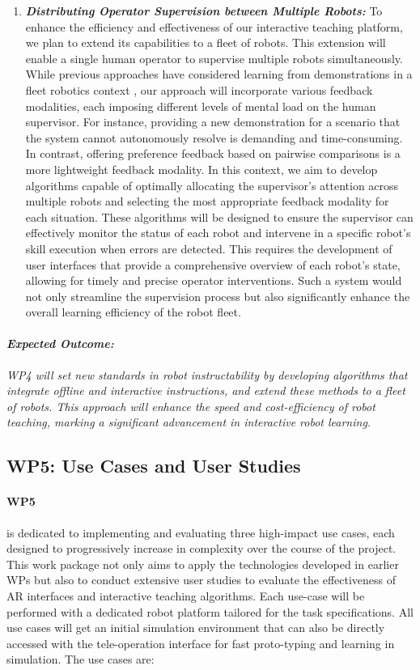 \documentclass{erc-B2}
\begin{document}
\begin{enumerate}
\item \textit{\textbf{Distributing Operator Supervision between Multiple Robots:}} 
To enhance the efficiency and effectiveness of our interactive teaching platform, we plan to extend its capabilities to a fleet of robots. This extension will enable a single human operator to supervise multiple robots simultaneously. While previous approaches have considered learning from demonstrations in a fleet robotics context \cite{hoque2022fleetdagger}, our approach will incorporate various feedback modalities, each imposing different levels of mental load on the human supervisor. For instance, providing a new demonstration for a scenario that the system cannot autonomously resolve is demanding and time-consuming. In contrast, offering preference feedback based on pairwise comparisons is a more lightweight feedback modality.
In this context, we aim to develop algorithms capable of optimally allocating the supervisor's attention across multiple robots and selecting the most appropriate feedback modality for each situation. These algorithms will be designed to ensure the supervisor can effectively monitor the status of each robot and intervene in a specific robot's skill execution when errors are detected. This requires the development of user interfaces that provide a comprehensive overview of each robot's state, allowing for timely and precise operator interventions.
Such a system would not only streamline the supervision process but also significantly enhance the overall learning efficiency of the robot fleet.  
\end{enumerate}
\paragraph{\textit{Expected Outcome:}} \textit{WP4 will set new standards in robot instructability by developing algorithms that integrate offline and interactive instructions, and extend these methods to a fleet of robots. This approach will enhance the speed and cost-efficiency of robot teaching, marking a significant advancement in interactive robot learning.}

\subsection{WP5: Use Cases and User Studies}
\paragraph{WP5} is dedicated to implementing and evaluating three high-impact use cases, each designed to progressively increase in complexity over the course of the project. This work package not only aims to apply the technologies developed in earlier WPs but also to conduct extensive user studies to evaluate the effectiveness of AR interfaces and interactive teaching algorithms. Each use-case will be performed with a dedicated robot platform tailored for the task specifications. All use cases will get an initial simulation environment that can also be directly accessed with the tele-operation interface for fast proto-typing and learning in simulation. 
The use cases are:
\end{document}
